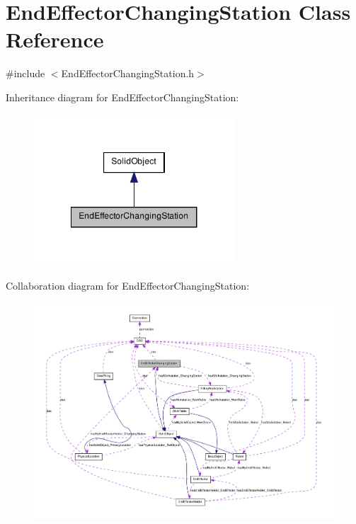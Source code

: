 \hypertarget{class_end_effector_changing_station}{
\section{EndEffectorChangingStation Class Reference}
\label{class_end_effector_changing_station}
}


{\ttfamily \#include $<$EndEffectorChangingStation.h$>$}



Inheritance diagram for EndEffectorChangingStation:\nopagebreak
\begin{figure}[H]
\begin{center}
\leavevmode
\includegraphics[width=212pt]{class_end_effector_changing_station__inherit__graph}
\end{center}
\end{figure}


Collaboration diagram for EndEffectorChangingStation:\nopagebreak
\begin{figure}[H]
\begin{center}
\leavevmode
\includegraphics[width=400pt]{class_end_effector_changing_station__coll__graph}
\end{center}
\end{figure}
